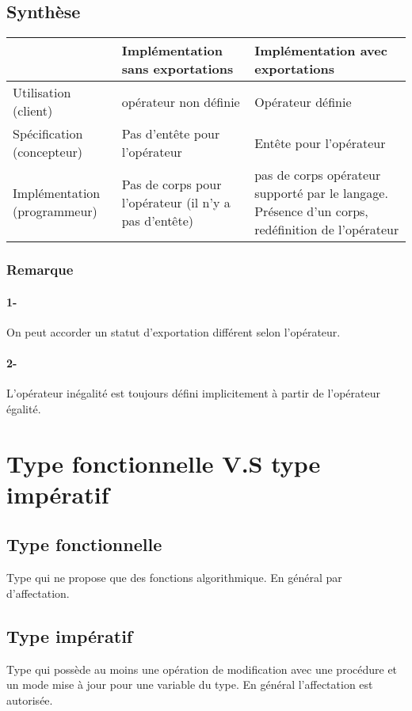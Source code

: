 	\subsection{Synthèse}
		\begin{tabular}{|p{3cm}|p{7cm}|p{7cm}|}
			\hline
				& Implémentation sans exportations & Implémentation avec exportations\\ %
			\hline
				Utilisation (client) & opérateur non définie & Opérateur définie\\
			\hline 
				Spécification (concepteur) & Pas d'entête pour l'opérateur & Entête pour l'opérateur \\ 
			\hline
				Implémentation (programmeur) & Pas de corps pour l'opérateur (il n'y a pas d'entête) &pas de corps opérateur supporté par le langage. Présence d'un corps, redéfinition de l'opérateur\\
			\hline
		\end{tabular}
		\subsubsection{Remarque}
			\paragraph{1- } 
				On peut accorder un statut d'exportation différent selon l'opérateur. 
			\paragraph{2- } 
				L'opérateur inégalité est toujours défini implicitement à partir de l'opérateur égalité.	


\section{Type fonctionnelle V.S type impératif}
	\subsection{Type fonctionnelle}
		Type qui ne propose que des fonctions algorithmique. En général par d'affectation.  
	\subsection{Type impératif}
		Type qui possède au moins une opération de modification avec une procédure et un mode mise à jour pour une 
		variable du type. En général l'affectation est autorisée.
